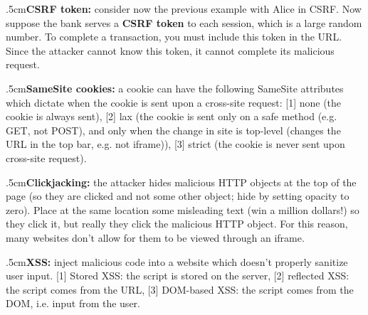 \quitvmode\kern.5cm{\bf CSRF token:} consider now the previous example with Alice in CSRF.
Now suppose the bank serves a {\bf CSRF token} to each session, which is a large random number.
To complete a transaction, you must include this token in the URL.
Since the attacker cannot know this token, it cannot complete its malicious request.

\quitvmode\kern.5cm{\bf SameSite cookies:} a cookie can have the following SameSite attributes which dictate when the cookie is sent upon a cross-site request: [1] none (the cookie is always sent), [2] lax
(the cookie is sent only on a safe method (e.g. GET, not POST), and only when the change in site is top-level (changes the URL in the top bar, e.g. not iframe)), [3] strict (the cookie is never sent upon
cross-site request).

\quitvmode\kern.5cm{\bf Clickjacking:} the attacker hides malicious HTTP objects at the top of the page (so they are clicked and not some other object; hide by setting opacity to zero).
Place at the same location some misleading text (win a million dollars!) so they click it, but really they click the malicious HTTP object.
For this reason, many websites don't allow for them to be viewed through an iframe.

\quitvmode\kern.5cm{\bf XSS:} inject malicious code into a website which doesn't properly sanitize user input.
[1] Stored XSS: the script is stored on the server, [2] reflected XSS: the script comes from the URL, [3] DOM-based XSS: the script comes from the DOM, i.e. input from the user.

\bye

